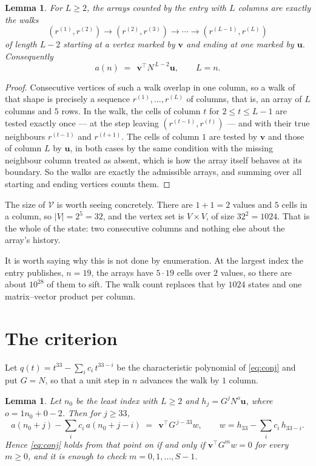 \documentclass[11pt,a4paper]{article}
\theoremstyle{plain}
\newtheorem{lemma}[theorem]{Lemma}
\theoremstyle{definition}
\begin{document}
\begin{lemma}\label{lem:walk}
For $L\ge2$, the arrays counted by the entry with $L$ columns are exactly the walks
\[
(r^{(1)},r^{(2)})\to(r^{(2)},r^{(3)})\to\cdots\to(r^{(L-1)},r^{(L)})
\]
of length $L-2$ starting at a vertex marked by $\mathbf{v}$ and ending at one marked by
$\mathbf{u}$. Consequently
\[
a(n)\;=\;\,\mathbf{v}^{\!\top}N^{\,L-2}\mathbf{u},\qquad L=n .
\]
\end{lemma}

\begin{proof}
Consecutive vertices of such a walk overlap in one column, so a walk of that shape is
precisely a sequence $r^{(1)},\dots,r^{(L)}$ of columns, that is, an array of $L$ columns
and $5$ rows. In the walk, the cells of column $t$ for $2\le t\le L-1$ are tested
exactly once --- at the step leaving $(r^{(t-1)},r^{(t)})$ --- and with their true
neighbours $r^{(t-1)}$ and $r^{(t+1)}$. The cells of column $1$ are tested by
$\mathbf{v}$ and those of column $L$ by $\mathbf{u}$, in both cases by the same condition
with the missing neighbour column treated as absent, which is how the array itself behaves at
its boundary. So the walks are exactly the admissible arrays, and summing over all starting
and ending vertices counts them.
\end{proof}


The size of $\mathcal V$ is worth seeing concretely. There are $1+1=2$ values
and $5$ cells in a column, so $|V|=2^{5}=32$, and the vertex set is
$V\times V$, of size $32^2=1024$. That is the whole of the state: two consecutive
columns and nothing else about the array's history.

It is worth saying why this is not done by enumeration. At the largest index the entry
publishes, $n=19$, the arrays have $5\cdot19$ cells over
$2$ values, so there are about $10^{28}$ of them to sift. The
walk count replaces that by $1024$ states and one matrix--vector product per column.
\section{The criterion}

Let $q(t)=t^{33}-\sum_i c_i\,t^{33-i}$ be the characteristic polynomial of
\eqref{eq:conj} and put $G=N$, so that a unit step in $n$ advances the walk by
$1$ column.

\begin{lemma}\label{lem:crit}
Let $n_0$ be the least index with $L\ge2$ and $h_j=G^{j}N^{o}\mathbf{u}$, where
$o=1n_0+0-2$. Then for $j\ge33$,
\[
a(n_0+j)-\sum_i c_i\,a(n_0+j-i)\;=\;\,\mathbf{v}^{\!\top}G^{\,j-33}w,
\qquad w=h_{33}-\sum_i c_i\,h_{33-i} .
\]
Hence \eqref{eq:conj} holds from that point on if and only if
$\mathbf{v}^{\!\top}G^{m}w=0$ for every $m\ge0$, and it is enough to check
$m=0,1,\dots,S-1$.
\end{lemma}
\end{document}

